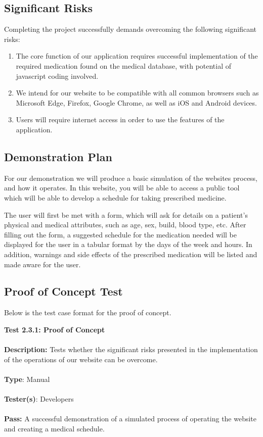 \documentclass[12pt]{article}
\begin{document}
\subsection{Significant Risks}
Completing the project successfully demands overcoming the following significant risks:
\begin{enumerate}
\item The core function of our application requires successful implementation of the required medication found on the medical database, with potential of javascript coding involved.
\item We intend for our website to be compatible with all common browsers such as Microsoft Edge, Firefox, Google Chrome, as well as iOS and Android devices.
\item Users will require internet access in order to use the features of the application.
\end{enumerate}

\subsection{Demonstration Plan}
For our demonstration we will produce a basic simulation of the website\textquotesingle s process, and how it operates. In this website, you will be able to access a public tool which will be able to develop a schedule for taking prescribed medicine. 

The user will first be met with a form, which will ask for details on a patient’s physical and medical attributes, such as age, sex, build, blood type, etc. After filling out the form,  a suggested schedule for the medication needed will be displayed for the user in a tabular format by the days of the week and hours. In addition, warnings and side effects of the prescribed medication will be listed and made aware for the user.

\subsection{Proof of Concept Test}
Below is the test case format for the proof of concept.

\begin{tcolorbox}
\textbf{Test 2.3.1: Proof of Concept} \\ \\
\textbf{Description:} Tests whether the significant risks presented in the implementation of the operations of our website can be overcome. \\ \\
\textbf{Type}: Manual \\ \\
\textbf{Tester(s)}: Developers \\ \\
\textbf{Pass:} A successful demonstration of a simulated process of operating the website and creating a medical schedule. \\ \\
\end{tcolorbox}
\end{document}
